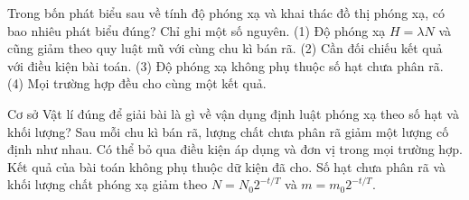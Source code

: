 \begin{ex}
Trong bốn phát biểu sau về tính độ phóng xạ và khai thác đồ thị phóng xạ, có bao nhiêu phát biểu đúng? Chỉ ghi một số nguyên. (1) Độ phóng xạ $H=\lambda N$ và cũng giảm theo quy luật mũ với cùng chu kì bán rã. (2) Cần đối chiếu kết quả với điều kiện bài toán. (3) Độ phóng xạ không phụ thuộc số hạt chưa phân rã. (4) Mọi trường hợp đều cho cùng một kết quả.
\end{ex}

\begin{ex}
Cơ sở Vật lí đúng để giải bài là gì về vận dụng định luật phóng xạ theo số hạt và khối lượng?
\choice
{Sau mỗi chu kì bán rã, lượng chất chưa phân rã giảm một lượng cố định như nhau.}
{Có thể bỏ qua điều kiện áp dụng và đơn vị trong mọi trường hợp.}
{Kết quả của bài toán không phụ thuộc dữ kiện đã cho.}
{\True Số hạt chưa phân rã và khối lượng chất phóng xạ giảm theo $N=N_0 2^{-t/T}$ và $m=m_0 2^{-t/T}$.}
\end{ex}

